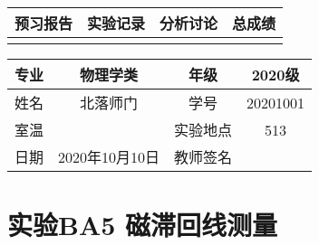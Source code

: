 \documentclass[a4paper,12pt]{ctexart}
\begin{document}
\begin{table}[htbp]
    \centering
    \renewcommand\arraystretch{2}
    \setlength{\tabcolsep}{9mm}
    \begin{tabular}{|c|c|c|c|c|c|c|c|}

        \hline
        \multicolumn{2}{|c|}{预习报告}&
        \multicolumn{2}{c|}{实验记录}&
        \multicolumn{2}{c|}{分析讨论}&
        \multicolumn{2}{c|}{总成绩}\\
        \hline
            & & & & & & &  \\
        \hline
    \end{tabular}
\end{table}
\begin{table}[htbp]
	\centering
	\renewcommand\arraystretch{2}
	\setlength{\tabcolsep}{9mm}
	\begin{tabular}{|c|c|c|c|}
	\hline
	专业& 物理学类 & 年级 & 2020级 \\
	\hline
	姓名& 北落师门 & 学号 & 20201001 \\
	\hline
	室温&  & 实验地点 & 513 \\
	\hline
	日期& 2020年10月10日 & 教师签名& \\
	\hline
	\end{tabular}
\end{table}

\section*{实验BA5 磁滞回线测量}
\end{document}
